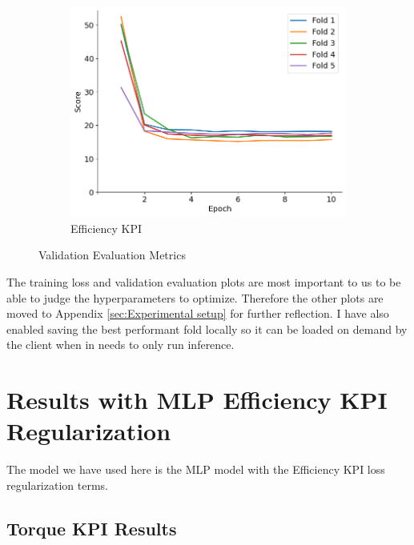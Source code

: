\documentclass{report} %
\begin{document}
\begin{figure}[H]
    \begin{subfigure}{0.32\textwidth}
        \centering
        \includegraphics[width=\textwidth]{./ReportImages/val_score_y2.png}
        \caption{\centering Efficiency \ac{KPI}}
        \label{fig:Validation Score for Efficiency grid}
    \end{subfigure}
    \caption{Validation Evaluation Metrics}
    \label{fig:Validation Evaluation Metrics}
\end{figure} 

The training loss and validation evaluation plots are most important to us to be able to judge the hyperparameters to optimize. 
Therefore the other plots are moved to Appendix \ref{sec:Experimental setup} for further reflection.
I have also enabled saving the best performant fold locally so it can be loaded on demand by the client when in needs to only run inference.

\section{Results with MLP Efficiency KPI Regularization}\label{sec:Results with MLP Efficiency KPI Regularization}
The model we have used here is the \ac{MLP} model with the Efficiency \ac{KPI} loss regularization terms.
\subsection{Torque KPI Results}\label{subsec:Torque KPI Results with MLP Efficiency KPI Regularization}
\end{document}
